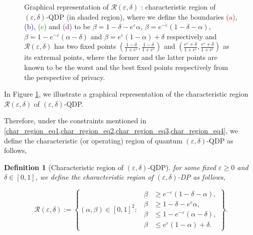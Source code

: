 \documentclass[onecolumn,ldraftcls, 11pt]{IEEEtran}
\newcommand{\eps}{\varepsilon}
\newcommand*{\cR}{\mathcal{R}}
\newtheorem{definition}{Definition}
\begin{document}
\begin{figure}[h]
    \caption{Graphical representation of  $\cR(\eps,\delta)$ : characteristic region of $(\eps,\delta)$-QDP (in shaded region), where we define the boundaries  \textcolor{red}{(a)}, \textcolor{blue}{(b)}, \textcolor{green}{(c)} and \textcolor{purple}{(d)} to be $\beta = 1- \delta - e^\eps \alpha$, $\beta = e^{-\eps} (1-\delta-\alpha)$, $\beta = 1 - e^{-\eps}(\alpha - \delta)$ and $\beta = e^\eps(1-\alpha) + \delta$ respectively and $\cR(\eps,\delta)$ has two fixed points $(\frac{1-\delta}{1+e^\eps},\frac{1-\delta}{1+e^\eps})$ and $(\frac{e^\eps + \delta}{1+e^\eps}, \frac{e^\eps + \delta}{1+e^\eps})$ as its extremal points, where the former and the latter points are known to be the worst and the best fixed points respectively from the perspective of privacy.}
    \label{fig:privacy_region}
\end{figure}
In Figure \ref{fig:privacy_region}, we illustrate a graphical representation of the characteristic region $\cR(\eps,\delta)$ of $(\eps,\delta)$-QDP.

Therefore, under the constraints mentioned in \cref{char_region_eq1,char_region_eq2,char_region_eq3,char_region_eq4}, we define the characteristic (or operating) region of quantum $(\eps,\delta)$-QDP as follows,

\begin{definition}[Characteristic region of $(\eps,\delta)$-QDP]\label{def_DP_char}
    for some fixed $\eps \geq 0$ and $\delta \in [0,1]$, we define the characteristic region of $(\eps,\delta)$-DP as follows,

    \begin{equation}
        \cR(\eps,\delta) := \left\{(\alpha,\beta) \in [0,1]^2 : ~~\begin{split}
            \beta &\geq e^{-\eps}(1-\delta -\alpha),\\
        \beta &\geq 1 -\delta - e^{\eps}\alpha,\\
        \beta &\leq 1 - e^{-\eps}(\alpha - \delta),\\
        \beta &\leq e^{\eps}(1- \alpha) + \delta.
        \end{split}\right\}.
    \end{equation}
\end{definition}
\end{document}
